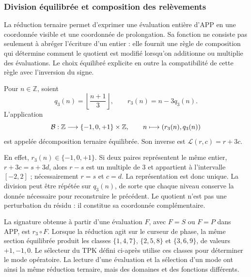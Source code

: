 \subsubsection{Division équilibrée et composition des relèvements}
\label{trit-ampl-div-balanceada}

La réduction ternaire permet d'exprimer une évaluation entière d'APP en une
coordonnée visible et une coordonnée de prolongation. Sa fonction ne consiste
pas seulement à abréger l'écriture d'un entier : elle fournit une règle de
composition qui détermine comment le quotient est modifié lorsqu'on additionne ou
multiplie des évaluations. Le choix équilibré explicite en outre la
compatibilité de cette règle avec l'inversion du signe.

\begin{definition}
\label{trit-ampl-def-coordenadas}
Pour \(n\in\mathbb Z\), soient
\[
 q_3(n)=\left\lfloor\frac{n+1}{3}\right\rfloor,\qquad
 r_3(n)=n-3q_3(n).
\]
L'application
\[
 \mathcal B:\mathbb Z\longrightarrow\{-1,0,+1\}\times\mathbb Z,\qquad
 n\longmapsto(r_3(n),q_3(n))
\]
est appelée décomposition ternaire équilibrée. Son inverse est
\(\mathcal L(r,c)=r+3c\).
\end{definition}

En effet, \(r_3(n)\in\{-1,0,+1\}\). Si deux paires représentent le même entier,
\(r+3c=s+3d\), alors \(r-s\) est un multiple de \(3\) et appartient à l'intervalle
\([-2,2]\) ; nécessairement \(r=s\) et \(c=d\). La représentation est donc
unique. La division peut être répétée sur \(q_3(n)\), de sorte que chaque niveau
conserve la donnée nécessaire pour reconstruire le précédent. Le quotient n'est pas une
perturbation du résidu : il constitue sa coordonnée complémentaire.

La signature obtenue à partir d'une évaluation \(F\), avec \(F=S\) ou \(F=P\) dans APP, est \(r_3\circ F\). Lorsque la réduction agit sur le curseur de phase, la même section équilibrée produit les classes \(\{1,4,7\}\), \(\{2,5,8\}\) et \(\{3,6,9\}\), de valeurs \(+1,-1,0\). Le sélecteur du TPK défini ci-après utilise ces classes pour déterminer le mode opératoire. La lecture d'une évaluation et la sélection d'un mode ont ainsi la même réduction ternaire, mais des domaines et des fonctions différents.

